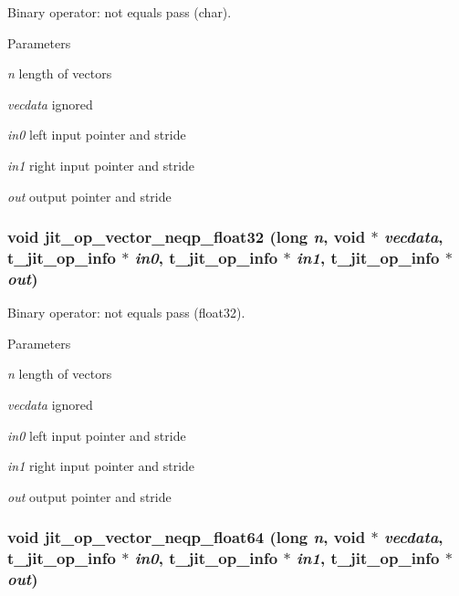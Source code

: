 Binary operator: not equals pass (char). 
\begin{DoxyParams}{Parameters}
\item[{\em n}]length of vectors \item[{\em vecdata}]ignored \item[{\em in0}]left input pointer and stride \item[{\em in1}]right input pointer and stride \item[{\em out}]output pointer and stride \end{DoxyParams}
\hypertarget{group__opvecmod_ga047be97619e283805d362677cf79c21a}{
\subsubsection[{jit\_\-op\_\-vector\_\-neqp\_\-float32}]{\setlength{\rightskip}{0pt plus 5cm}void jit\_\-op\_\-vector\_\-neqp\_\-float32 (long {\em n}, \/  void $\ast$ {\em vecdata}, \/  {\bf t\_\-jit\_\-op\_\-info} $\ast$ {\em in0}, \/  {\bf t\_\-jit\_\-op\_\-info} $\ast$ {\em in1}, \/  {\bf t\_\-jit\_\-op\_\-info} $\ast$ {\em out})}}
\label{group__opvecmod_ga047be97619e283805d362677cf79c21a}


Binary operator: not equals pass (float32). 
\begin{DoxyParams}{Parameters}
\item[{\em n}]length of vectors \item[{\em vecdata}]ignored \item[{\em in0}]left input pointer and stride \item[{\em in1}]right input pointer and stride \item[{\em out}]output pointer and stride \end{DoxyParams}
\hypertarget{group__opvecmod_gad8c1462061d6238807b8441818019782}{
\subsubsection[{jit\_\-op\_\-vector\_\-neqp\_\-float64}]{\setlength{\rightskip}{0pt plus 5cm}void jit\_\-op\_\-vector\_\-neqp\_\-float64 (long {\em n}, \/  void $\ast$ {\em vecdata}, \/  {\bf t\_\-jit\_\-op\_\-info} $\ast$ {\em in0}, \/  {\bf t\_\-jit\_\-op\_\-info} $\ast$ {\em in1}, \/  {\bf t\_\-jit\_\-op\_\-info} $\ast$ {\em out})}}
\label{group__opvecmod_gad8c1462061d6238807b8441818019782}


